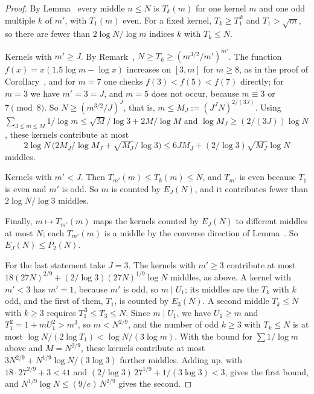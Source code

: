 \begin{proof}
By Lemma~ every middle $n \le N$ is $T_k(m)$ for one kernel $m$ and one odd multiple $k$ of $m'$, with $T_1(m)$
even. For a fixed kernel, $T_k \ge T_1^{\,k}$ and $T_1 > \sqrt{m}$, so there are fewer than $2 \log N/\log m$ indices $k$ with $T_k \le N$.

Kernels with $m' \ge J$. By Remark~, $N \ge T_k \ge (m^{3/2}/m')^{m'}$. The function
$f(x) = x(1.5 \log m - \log x)$ increases on $[3, m]$ for $m \ge 8$, as in the proof of Corollary~, and for $m = 7$ one
checks $f(3) < f(5) < f(7)$ directly; for $m = 3$ we have $m' = 3 = J$, and $m = 5$ does not occur, because $m \equiv 3$ or $7 \pmod 8$. So $N \ge (m^{3/2}/J)^J$, that is, $m \le M_J := (J^J N)^{2/(3J)}$. Using
$\sum_{3 \le m \le M} 1/\log m \le \sqrt{M}/\log 3 + 2M/\log M$ and $\log M_J \ge (2/(3J)) \log N$, these kernels contribute at most
\[
2 \log N\, \bigl(2M_J/\log M_J + \sqrt{M_J}/\log 3\bigr) \le 6J M_J + (2/\log 3) \sqrt{M_J} \log N
\]
middles.

Kernels with $m' < J$. Then $T_{m'}(m) \le T_k(m) \le N$, and $T_{m'}$ is even because $T_1$ is even and $m'$ is odd. So $m$ is counted by
$E_J(N)$, and it contributes fewer than $2 \log N/\log 3$ middles.

Finally, $m \mapsto T_{m'}(m)$ maps the kernels counted by $E_J(N)$ to different middles at most $N$; each $T_{m'}(m)$ is a middle
by the converse direction of Lemma~. So $E_J(N) \le P_2(N)$.

For the last statement take $J = 3$. The kernels with $m' \ge 3$ contribute at most $18(27N)^{2/9} + (2/\log 3)(27N)^{1/9} \log N$ middles,
as above. A kernel with $m' < 3$ has $m' = 1$, because $m'$ is odd, so $m \mid U_1$; its middles are the $T_k$ with $k$ odd, and the first of
them, $T_1$, is counted by $E_3(N)$. A second middle $T_k \le N$ with $k \ge 3$ requires $T_1^{\,3} \le T_3 \le N$. Since $m \mid U_1$, we
have $U_1 \ge m$ and $T_1^2 = 1 + m U_1^2 > m^3$, so $m < N^{2/9}$, and the number of odd $k \ge 3$ with $T_k \le N$ is at most
$\log N/(2 \log T_1) < \log N/(3 \log m)$. With the bound for $\sum 1/\log m$ above and $M = N^{2/9}$, these kernels contribute at most
$3 N^{2/9} + N^{1/9} \log N/(3 \log 3)$ further middles. Adding up, with $18 \cdot 27^{2/9} + 3 < 41$ and
$(2/\log 3)\, 27^{1/9} + 1/(3 \log 3) < 3$, gives the first bound, and $N^{1/9} \log N \le (9/e)\, N^{2/9}$ gives the second.
\end{proof}

